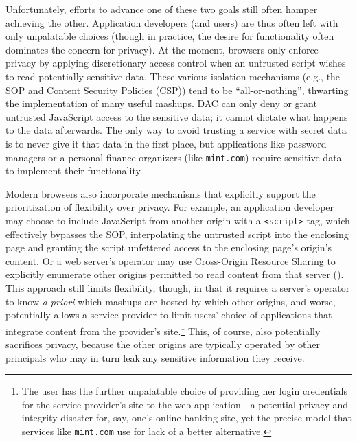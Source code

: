 Unfortunately, efforts to advance one of these two goals still often hamper achieving
the other. Application developers (and users) are thus often left with
only unpalatable choices (though in practice, the desire for
functionality often dominates the concern for privacy).
%
At the moment, browsers only enforce privacy by applying discretionary
access control when an untrusted script wishes to read potentially
sensitive data.
%
These various isolation mechanisms (e.g., the SOP and Content Security Policies (CSP)) tend
to be ``all-or-nothing'', thwarting the implementation
of many useful mashups.
%
DAC can only deny or grant
untrusted JavaScript access to the sensitive data; it cannot
dictate what happens to the data afterwards.
%
The only way to avoid trusting a service with secret data is to never give
it that data in the first place, but applications like password
managers or a personal finance organizers (like {\tt mint.com}) require
sensitive data to implement their functionality.

Modern browsers also incorporate mechanisms that explicitly support
the prioritization of flexibility over privacy. For example, an
application developer may choose to include JavaScript from another
origin with a {\tt <script>} tag, which effectively bypasses the SOP,
interpolating the untrusted script into the enclosing page and
granting the script unfettered access to the enclosing page's origin's
content. Or a web server's operator may use Cross-Origin Resource
Sharing to
explicitly enumerate other origins permitted to read content from that
server ().
This approach still limits flexibility, though, in that it requires a
server's operator to know {\em a priori} which mashups are hosted by
which other origins, and worse, potentially allows a service provider
to limit users' choice of applications that integrate content from the
provider's site.\footnote{The user has the further unpalatable
  choice of providing her login credentials for the service
  provider's site to the web application---a potential
  privacy and integrity disaster for, say, one's online banking site,
  yet the precise model that services like {\tt mint.com} use for lack
  of a better alternative.} This, of course, also potentially sacrifices
privacy, because the other origins are typically operated by other
principals who may in turn leak any sensitive information they
receive.

